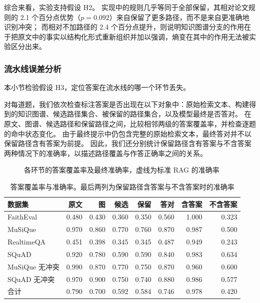 综合来看，实验支持假设 H2。
实现中的规则几乎等同于全部保留，其相对论文规则的 2.1 个百分点优势（$p=0.092$）来自保留了更多路径，而不是来自更准确地识别冲突；
而相对不加路径的 2.4 个百分点提升，则说明知识图谱分支的作用在于把原文中的事实以结构化形式重新组织并加以强调，熵变在其中的作用无法被实验区分出来。

\subsubsection{流水线误差分析}
\label{sec:cl-e3}

本小节检验假设 H3，定位答案在流水线的哪一个环节丢失。

对每道题，我们依次检查标注答案是否出现在以下对象中：原始检索文本、构建得到的知识图谱、候选路径集合、被保留的路径集合，以及模型最终是否答对。
在原文、图谱、候选路径和保留路径之间，比较相邻两级的答案覆盖率，并检查逐题的命中状态变化。
由于最终提示中仍包含完整的原始检索文本，最终答对并不以保留路径含有答案为前提。
因此，我们还分别统计保留路径含有答案与不含答案两种情况下的准确率，以描述路径覆盖与作答正确率之间的关系。

\begin{figure}[htbp]
  \centering
  \caption{各环节的答案覆盖率及最终准确率，虚线为标准 RAG 的准确率}
  \label{fig:cl-e3}
\end{figure}

\begin{table}[htbp]
  \centering
  \small
  \renewcommand{\arraystretch}{1.3}
  \caption{答案覆盖率与准确率。最后两列为保留路径含答案与不含答案时的准确率}
  \label{tab:cl-e3}
  \begin{tabular}{lrrrrrrr}
    \toprule
    数据集 & 原文 & 图 & 候选 & 保留 & 答对 & 含答案 & 不含答案 \\
    \midrule
    FaithEval    & 0.480 & 0.430 & 0.360 & 0.350 & 0.560 & 1.000 & 0.323 \\
    MuSiQue      & 0.970 & 0.860 & 0.770 & 0.760 & 0.870 & 0.987 & 0.500 \\
    RealtimeQA   & 0.451 & 0.398 & 0.345 & 0.345 & 0.487 & 0.949 & 0.243 \\
    SQuAD        & 0.920 & 0.780 & 0.590 & 0.590 & 0.840 & 0.983 & 0.634 \\
    MuSiQue 无冲突 & 0.990 & 0.870 & 0.770 & 0.750 & 0.870 & 0.960 & 0.600 \\
    SQuAD 无冲突   & 0.970 & 0.900 & 0.750 & 0.740 & 0.880 & 0.986 & 0.577 \\
    合计         & 0.790 & 0.700 & 0.592 & 0.584 & 0.746 & 0.978 & 0.420 \\
    \bottomrule
  \end{tabular}
\end{table}

